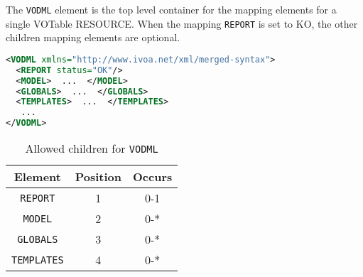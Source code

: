 The \texttt{VODML} element is the top level container for the mapping elements for a single VOTable RESOURCE.
When the mapping \texttt{REPORT} is set to KO, the other children mapping elements are optional.

\begin{lstlisting}[caption={Example \texttt{VODML} mapping block},language=XML]
<VODML xmlns="http://www.ivoa.net/xml/merged-syntax">
  <REPORT status="OK"/>
  <MODEL>  ...  </MODEL>
  <GLOBALS>  ...  </GLOBALS>
  <TEMPLATES>  ...  </TEMPLATES>
   ...
</VODML>
\end{lstlisting}

\begin{table}[!htbp]
  \small
  \centering
  \begin{tabulary}{\linewidth}{|c |c |c|}
    \hline 
        \textbf{Element} &
        \textbf{Position} &
        \textbf{Occurs}\\
    \hline
    \hline  
      \texttt{REPORT} &           
      1 &           
      0-1\\
    \hline  
      \texttt{MODEL} &           
      2 &           
      0-*\\
    \hline    
      \texttt{GLOBALS} &           
      3 &           
      0-*\\
    \hline  
      \texttt{TEMPLATES} &           
      4 &           
      0-*\\
    \hline 
  \end{tabulary}
    \caption{Allowed children for \texttt{VODML}} 
    \label{tbl:vodml-children}
\end{table}



